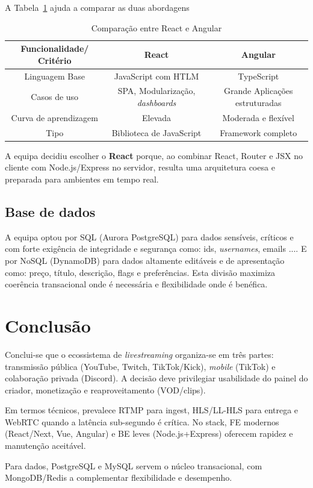 A Tabela~\ref{tab:ang-rea-comp} ajuda a comparar as duas abordagens

\begin{table}[H]
\caption{Comparação entre React e Angular}
\label{tab:ang-rea-comp}
\begin{center}
\small
\begin{tabular}{|c|c|c|}
\hline
\textbf{Funcionalidade/ Critério} & \textbf{React} & \textbf{Angular}\\ \hline
Linguagem Base & JavaScript com HTLM & TypeScript \\ \hline
Casos de uso &  SPA, Modularização, \textit{dashboards} & Grande Aplicações estruturadas \\ \hline
Curva de aprendizagem & Elevada & Moderada e flexível \\ \hline
Tipo & Biblioteca de JavaScript & Framework completo \\ \hline
\end{tabular}
\end{center}
\end{table}

A equipa decidiu escolher o \textbf{React} porque, ao combinar React, Router e JSX no cliente com Node.js/Express no servidor, resulta uma arquitetura coesa e preparada para ambientes em tempo real.

\subsection{Base de dados}

A equipa optou por SQL (Aurora PostgreSQL) para dados sensíveis, críticos e com forte exigência de integridade e segurança como: ids, \textit{usernames}, emails .... E por NoSQL (DynamoDB) para dados altamente editáveis e de apresentação como: preço, título, descrição, flags e preferências. Esta divisão maximiza coerência transacional onde é necessária e flexibilidade onde é benéfica.

\section{Conclusão}

Conclui-se que o ecossistema de \textit{livestreaming} organiza-se em três partes: transmissão pública (YouTube, Twitch, TikTok/Kick), \textit{mobile} (TikTok) e colaboração privada (Discord). A decisão deve privilegiar usabilidade do painel do criador, monetização e reaproveitamento (VOD/clips).

Em termos técnicos, prevalece RTMP para ingest, HLS/LL-HLS para entrega e WebRTC quando a latência sub-segundo é crítica. No stack, FE modernos (React/Next, Vue, Angular) e BE leves (Node.js+Express) oferecem rapidez e manutenção aceitável. 

Para dados, PostgreSQL e MySQL servem o núcleo transacional, com MongoDB/Redis a complementar flexibilidade e desempenho.


\vspace{20mm} 




